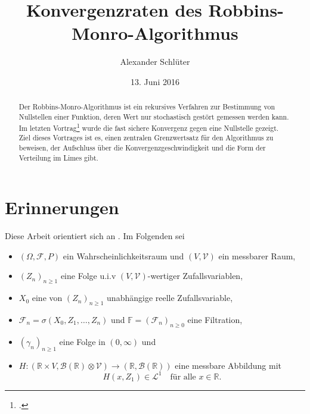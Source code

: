 \documentclass[ngerman,a4paper,11pt]{scrartcl}
\newcommand{\FF}{\mathbb{F}}
\newcommand{\RR}{\mathbb{R}}
\newcommand{\bb}{\mathcal{B}}
\newcommand{\ff}{\mathcal{F}}
\renewcommand{\ll}{\mathcal{L}}
\newcommand{\vv}{\mathcal{V}}
\newcommand{\zspace}{V}
\newcommand{\zsigma}{\vv}
\newcommand{\interv}{\RR}
\begin{document}
\title{Konvergenzraten des Robbins-Monro-Algorithmus}
\author{Alexander Schlüter}
\date{13. Juni 2016}
\maketitle
\begin{abstract}
  Der Robbins-Monro-Algorithmus ist ein rekursives Verfahren zur Bestimmung von
  Nullstellen einer Funktion, deren Wert nur stochastisch gestört gemessen
  werden kann. Im letzten Vortrag\footcite{seb} wurde die fast sichere Konvergenz gegen eine
  Nullstelle gezeigt. Ziel dieses Vortrages ist es, einen zentralen
  Grenzwertsatz für den Algorithmus zu beweisen, der Aufschluss über die
  Konvergenzgeschwindigkeit und die Form der Verteilung im Limes gibt.
\end{abstract}
\tableofcontents

\section{Erinnerungen}
Diese Arbeit orientiert sich an \cite[Kapitel 11.1]{lusch}. Im Folgenden sei    
\begin{itemize}
\item $(\Omega, \ff, P)$ ein Wahrscheinlichkeitsraum und $(\zspace,\zsigma)$ ein messbarer Raum,
\item $(Z_n)_{n\geq 1}$ eine Folge u.i.v $(\zspace, \zsigma)$-wertiger Zufallsvariablen,
\item $X_0$ eine von $(Z_n)_{n\geq 1}$ unabhängige reelle Zufallsvariable,
\item $\ff_n=\sigma(X_0,Z_1,\dotsc,Z_n)$ und $\FF=(\ff_n)_{n\geq 0}$ eine Filtration,
\item $(\gamma_n)_{n\geq 1}$ eine Folge in $(0,\infty)$ und
\item $H:(\interv\times \zspace,\bb(\interv)\otimes\zsigma)\to(\RR,\bb(\RR))$ eine messbare
  Abbildung mit
  \begin{equation*}
    H(x,Z_1)\in\ll^1\quad\text{für alle $x\in \interv$.}
  \end{equation*}
\end{itemize}
\end{document}
